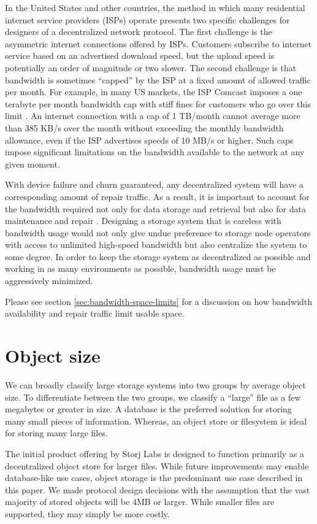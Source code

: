 \documentclass[8pt,fleqn,openany]{book}
\begin{document}
In the United States and other countries,
the method in which many residential internet service providers (ISPs)
operate presents two specific challenges for designers of a
decentralized network protocol. The first challenge is
the asymmetric internet connections offered by ISPs.
Customers subscribe to internet service
based on an advertised download speed, but the upload speed is potentially an
order of magnitude or two slower. The second challenge is that bandwidth is
sometimes ``capped'' by the ISP at a fixed amount of allowed traffic per month.
For example, in many
US markets, the ISP Comcast imposes a one terabyte per month bandwidth cap
with stiff fines for customers who go over this limit \cite{comcast-cap}.
An internet connection with a cap of 1 TB/month cannot average more than
385 KB/s over the month without exceeding the monthly bandwidth allowance,
even if the ISP advertises speeds of 10 MB/s or higher.
Such caps impose
significant limitations on the bandwidth available to the network
at any given moment.

With device failure and churn guaranteed, any decentralized system will have a
corresponding amount of repair traffic. As a result, it is important to account
for the bandwidth required not only for data storage and retrieval but also
for data maintenance and repair \cite{pick2-churn}. Designing a
storage system that is careless with bandwidth usage would not only give undue
preference to storage node operators with access to unlimited high-speed
bandwidth but also centralize the system to some degree. In order to keep the storage
system as decentralized as possible and working in as many environments
as possible, bandwidth usage must be aggressively minimized.

Please see section \ref{sec:bandwidth-space-limits} for a discussion on how
bandwidth availability and repair traffic limit usable space.

\section{Object size}

We can broadly classify large storage systems into two groups by average
object size. To differentiate between the two groups, we classify a ``large'' file as a
few megabytes or greater in size. A database is the
preferred solution for storing many small pieces of information.
Whereas, an object store or filesystem is ideal for storing many large files.

The initial product offering by Storj Labs is designed to function primarily as
a decentralized object store for larger files.
While future improvements may enable
database-like use cases, object storage is the predominant use case described in
this paper. We made protocol design decisions with the assumption that the
vast majority of stored objects will be 4MB or larger. While smaller files are
supported, they may simply be more costly.
\end{document}
